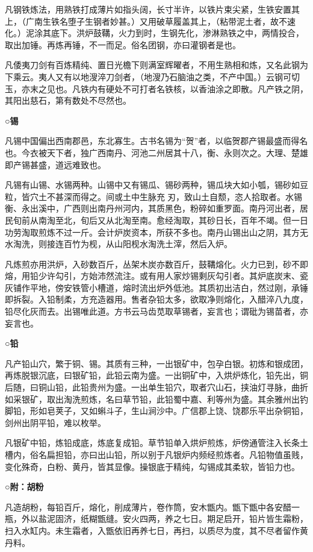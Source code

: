 \documentclass[]{article}
\begin{document}
凡钢铁炼法，用熟铁打成薄片如指头阔，长寸半许，以铁片束尖紧，生铁安置其上，（广南生铁名堕子生钢者妙甚。）又用破草履盖其上，（粘带泥土者，故不速化。）泥涂其底下。洪炉鼓鞲，火力到时，生钢先化，渗淋熟铁之中，两情投合，取出加锤。再炼再锤，不一而足。俗名团钢，亦曰灌钢者是也。

凡倭夷刀剑有百炼精纯、置日光檐下则满室辉曜者，不用生熟相和炼，又名此钢为下乘云。夷人又有以地溲淬刀剑者，（地溲乃石脑油之类，不产中国。）云钢可切玉，亦末之见也。凡铁内有硬处不可打者名铁核，以香油涂之即散。凡产铁之阴，其阳出慈石，第有数处不尽然也。

\textbf{○锡}

凡锡中国偏出西南郡邑，东北寡生。古书名锡为``贺''者，以临贺郡产锡最盛而得名也。今衣被天下者，独广西南丹、河池二州居其十八，衡、永则次之。大理、楚雄即产锡甚盛，道远难致也。

凡锡有山锡、水锡两种。山锡中又有锡瓜、锡砂两种，锡瓜块大如小瓠，锡砂如豆粒，皆穴土不甚深而得之。间或土中生脉充刃，致山土自颓，恣人拾取者。水锡衡、永出溪中，广西则出南丹州河内，其质黑色，粉碎如重罗面。南丹河出者，居民旬前从南淘至北，旬后又从北淘至南。愈经淘取，其砂日长，百年不竭。但一日功劳淘取煎炼不过一斤。会计炉炭资本，所获不多也。南丹山锡出山之阴，其方无水淘洗，则接连百竹为枧，从山阳枧水淘洗土滓，然后入炉。

凡炼煎亦用洪炉，入砂数百斤，丛架木炭亦数百斤，鼓鞲熔化。火力已到，砂不即熔，用铅少许勾引，方始沛然流注。或有用人家炒锡剩灰勾引者。其炉底炭末、瓷灰铺作平地，傍安铁管小槽道，熔时流出炉外低池。其质初出洁白，然过刚，承锤即拆裂。入铅制柔，方充造器用。售者杂铅太多，欲取净则熔化，入醋淬八九度，铅尽化灰而去。出锡唯此道。方书云马齿苋取草锡者，妄言也；谓砒为锡苗者，亦妄言也。

\textbf{○铅}

凡产铅山穴，繁于铜、锡。其质有三种，一出银矿中，包孕白银。初炼和银成团，再炼脱银沉底，曰银矿铅，此铅云南为盛。一出铜矿中，入烘炉炼化，铅先出，铜后随，曰铜山铅，此铅贵州为盛。一出单生铅穴，取者穴山石，挟油灯寻脉，曲折如采银矿，取出淘洗煎炼，名曰草节铅，此铅蜀中嘉、利等州为盛。其余雅州出钓脚铅，形如皂荚子，又如蝌斗子，生山涧沙中。广信郡上饶、饶郡乐平出杂铜铅，剑州出阴平铅，难以枚举。

凡银矿中铅，炼铅成底，炼底复成铅。草节铅单入烘炉煎炼，炉傍通管注入长条土槽内，俗名扁担铅，亦曰出山铅，所以别于凡银炉内频经煎炼者。凡铅物值虽贱，变化殊奇，白粉、黄丹，皆其显像。操银底于精纯，勾锡成其柔软，皆铅力也。

\textbf{○附：胡粉}

凡造胡粉，每铅百斤，熔化，削成薄片，卷作筒，安木甑内。甑下甑中各安醋一瓶，外以盐泥固济，纸糊甑缝。安火四两，养之七日。期足启开，铅片皆生霜粉，扫入水缸内。未生霜者，入甑依旧再养七日，再扫，以质尽为度，其不尽者留作黄丹料。
\end{document}

